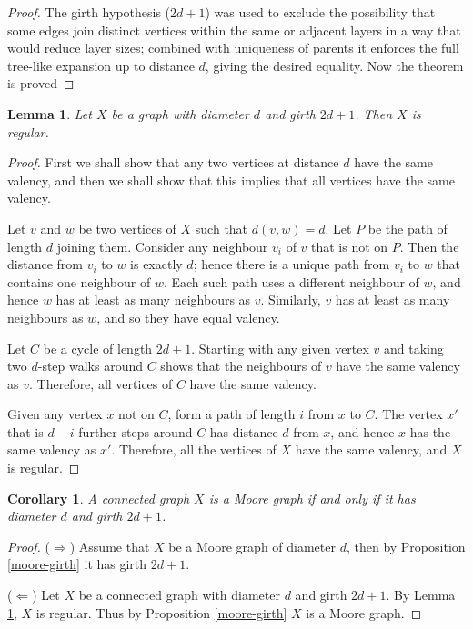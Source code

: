 \documentclass[12pt,a4paper,openany]{book}
\newtheorem{lemma}{Lemma}[section]
\newtheorem{corollary}{Corollary}[section]
\begin{document}
\begin{proof}
The girth hypothesis ($2d+1$) was used to exclude the possibility that
some edges join distinct vertices within the same or adjacent layers in a
way that would reduce layer sizes; combined with uniqueness of parents
it enforces the full tree-like expansion up to distance $d$, giving the
desired equality. Now the theorem is proved
\end{proof}

\begin{lemma}\label{regular}
Let $X$ be a graph with diameter $d$ and girth $2d + 1$. Then $X$ is regular.
\end{lemma}

\begin{proof}
First we shall show that any two vertices at distance $d$ have the same valency, and then we shall show that this implies that all vertices have the same valency. 

Let $v$ and $w$ be two vertices of $X$ such that $d(v, w) = d$. Let $P$ be the path of length $d$ joining them. Consider any neighbour $v_i$ of $v$ that is not on $P$. Then the distance from $v_i$ to $w$ is exactly $d$; hence there is a unique path from $v_i$ to $w$ that contains one neighbour of $w$. Each such path uses a different neighbour of $w$, and hence $w$ has at least as many neighbours as $v$. Similarly, $v$ has at least as many neighbours as $w$, and so they have equal valency.

Let $C$ be a cycle of length $2d + 1$. Starting with any given vertex $v$ and taking two $d$-step walks around $C$ shows that the neighbours of $v$ have the same valency as $v$. Therefore, all vertices of $C$ have the same valency.

Given any vertex $x$ not on $C$, form a path of length $i$ from $x$ to $C$. The vertex $x'$ that is $d - i$ further steps around $C$ has distance $d$ from $x$, and hence $x$ has the same valency as $x'$. Therefore, all the vertices of $X$ have the same valency, and $X$ is regular.
\end{proof}

\begin{corollary}\label{cor:moore-equivalence}
A connected graph $X$ is a Moore graph if and only if it has diameter $d$ and girth $2d+1$.
\end{corollary}

\begin{proof}
($\Rightarrow$) Assume that $X$ be a Moore graph of diameter $d$, then by Proposition \ref{moore-girth} it has girth $2d+1$.

($\Leftarrow$) Let $X$ be a connected graph with diameter $d$ and girth $2d+1$. By Lemma \ref{regular}, $X$ is regular. Thus by  Proposition \ref{moore-girth} $X$ is a Moore graph.
\end{proof}
\end{document}
